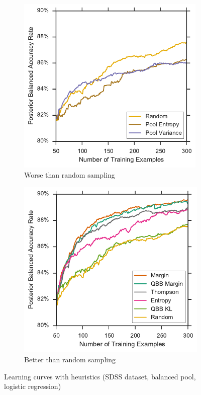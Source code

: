 \begin{figure}[p]
	\centering
	\begin{subfigure}{.5\textwidth}
		\centering
		\includegraphics[width=0.99\textwidth]{figures/5_active/sdss_br_ind_lower}
		\caption{Worse than random sampling}
		\label{fig:sdss_br_ind_lower}
	\end{subfigure}%
	\begin{subfigure}{.5\textwidth}
		\centering
		\includegraphics[width=0.99\linewidth]{figures/5_active/sdss_br_ind_upper}
		\caption{Better than random sampling}
		\label{fig:sdss_br_ind_upper}
	\end{subfigure}
	\caption[Learning curves with heuristics (SDSS, balanced, logistic)]{
		Learning curves with heuristics (SDSS dataset, balanced pool, logistic regression)}
	\label{fig:sdss_br_ind}
\end{figure}

